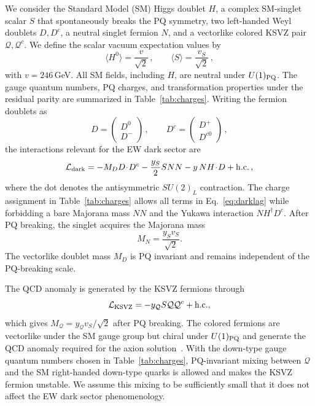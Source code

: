 \documentclass[aps,prd,reprint,preprintnumbers,superscriptaddress,nofootinbib,floatfix]{revtex4-2}
\begin{document}
We consider the Standard Model (SM) Higgs doublet $H$, a complex SM-singlet scalar $S$ that spontaneously breaks the PQ symmetry, two left-handed Weyl doublets $D,D^c$, a neutral singlet fermion $N$, and a vectorlike colored KSVZ pair $\mathcal Q,\mathcal Q^c$. We define the scalar vacuum expectation values by
\begin{equation}
    \langle H^0\rangle=\frac{v}{\sqrt{2}}\,,\qquad
    \langle S\rangle=\frac{v_S}{\sqrt{2}}\,,
    \label{eq:vevs}
\end{equation}
with $v=246$\,GeV. All SM fields, including $H$, are neutral under $U(1)_{\rm PQ}$. The gauge quantum numbers, PQ charges, and transformation properties under the residual parity are summarized in Table~\ref{tab:charges}. Writing the fermion doublets as
\begin{equation}
    D=\begin{pmatrix}D^0\\
    D^-\end{pmatrix}\,,\qquad D^c=\begin{pmatrix}D^+\\
    D^{c0}\end{pmatrix}\,,
\end{equation}
the interactions relevant for the EW dark sector are
\begin{equation}
    \mathcal L_{\rm dark} = - M_DD\!\cdot\!D^c -\frac{y_S}{2}SNN -y\,NH\!\cdot\!D +\mathrm{h.c.}\,,
    \label{eq:darklag}
\end{equation}
where the dot denotes the antisymmetric $SU(2)_L$ contraction. The charge assignment in Table~\ref{tab:charges} allows all terms in Eq.~\eqref{eq:darklag} while forbidding a bare Majorana mass $NN$ and the Yukawa interaction $NH^\dagger D^c$. After PQ breaking, the singlet acquires the Majorana mass
\begin{equation}
    M_N=\frac{y_Sv_S}{\sqrt{2}}.
    \label{eq:MN}
\end{equation}
The vectorlike doublet mass $M_D$ is PQ invariant and remains independent of the PQ-breaking scale.

The QCD anomaly is generated by the KSVZ fermions through
\begin{equation}
    \mathcal L_{\rm KSVZ} = -y_{\mathcal Q}S\mathcal Q\mathcal Q^c+\mathrm{h.c.},
    \label{eq:KSVZ}
\end{equation}
which gives $M_{\mathcal Q}=y_{\mathcal Q}v_S/\sqrt{2}$ after PQ breaking. The colored fermions are vectorlike under the SM gauge group but chiral under $U(1)_{\rm PQ}$ and generate the QCD anomaly required for the axion solution~\cite{Kim:1979if,Shifman:1979if}. With the down-type gauge quantum numbers chosen in Table~\ref{tab:charges}, PQ-invariant mixing between $\mathcal Q$ and the SM right-handed down-type quarks is allowed and makes the KSVZ fermion unstable. We assume this mixing to be sufficiently small that it does not affect the EW dark sector phenomenology.
\end{document}
